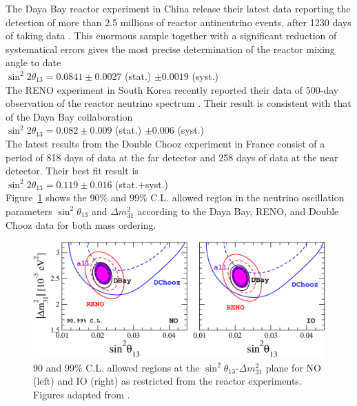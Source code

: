 \documentclass[english]{article}
\begin{document}
    The Daya Bay reactor experiment \cite{dayabay} in China release their latest data reporting the detection of more than 2.5 millions of reactor antineutrino events, after 1230 days of taking data \cite{dayabaydata}. This enormous sample together with a significant reduction of systematical errors gives the most precise determination of the reactor mixing angle to date\\
    
    $\sin^{2}{2\theta_{13}} = 0.0841 \pm 0.0027$ (stat.) $\pm 0.0019$ (syst.)\\
    
    The RENO experiment \cite{reno} in South Korea recently reported their data of 500-day observation of the reactor neutrino spectrum \cite{renodata}. Their result is consistent with that of the Daya Bay collaboration\\
    
    $\sin^{2}{2\theta_{13}} = 0.082 \pm 0.009$ (stat.) $\pm 0.006$ (syst.)\\
    
    The latest results from the Double Chooz experiment in France consist of a period of 818 days of data at the far detector and 258 days of data at the near detector. Their best fit result is \cite{doublechoozdata}\\
    
    $\sin^{2}{2\theta_{13}} = 0.119 \pm 0.016$ (stat.$+$syst.)\\
    
    Figure~\ref{fig:sq13-mq31-reactor} shows the 90\% and 99\% C.L. allowed region in the neutrino oscillation parameters $\sin^{2}{\theta_{13}}$ and $\Delta{m^{2}_{31}}$ according to the Daya Bay, RENO, and Double Chooz data for both mass ordering.
    
    \begin{figure}[!hbt]
		\begin{center}
        \centering
        \captionsetup{justification=centering}
		\includegraphics[scale=0.5]{sq13-mq31-reactor.pdf}
		\caption{90 and 99\% C.L. allowed regions at the $\sin^{2}{\theta_{13}}$-$\Delta{m^{2}_{31}}$ plane for NO (left) and IO (right) as restricted from the reactor experiments. Figures adapted from \cite{salas2018}.}
		\label{fig:sq13-mq31-reactor}
		\end{center}
	\end{figure}
\end{document}
